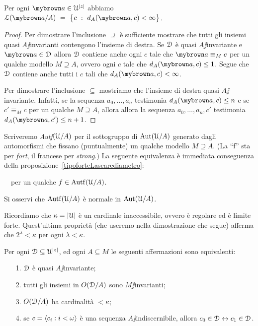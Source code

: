 \begin{proposition}\label{tipoforteLascarediametro} Per ogni ${\mr a}\in\U^{|z|}$ abbiamo $\Ll({\mr a}/A)\ =\ \big\{c\ :\ d_A({\mr a},c)<\infty\big\}$.
\end{proposition}

\begin{proof}
Per dimostrare l'inclusione $\supseteq$ \`e sufficiente mostrare che tutti gli insiemi quasi $A\jj$invarianti contengono l'insieme di destra. Se $\EuScript D$ \`e quasi $A\jj$invariante e ${\mr a}\in\D$ allora $\EuScript D$  contiene anche ogni $c$ tale che ${\mr a}\equiv_M c$ per un qualche modello $M\supseteq A$, ovvero ogni $c$ tale che $d_A({\mr a},c)\le 1$. Segue che $\EuScript D$ contiene anche tutti i $c$ tali che $d_A({\mr a},c)<\infty$. 

Per dimostrare l'inclusione $\subseteq$ mostriamo che l'insieme di destra quasi $A\jj$invariante. Infatti, se la sequenza $a_0,\dots,a_n$ testimonia  $d_A({\mr a},c)\le n$ e se $c'\equiv_Mc$ per un qualche $M\supseteq A$, allora allora la sequenza $a_0,\dots,a_n,c'$ testimonia $d_A({\mr a},c')\le n+1$.
\end{proof}

Scriveremo \emph{Autf$(\EuScript U/A)$\/} per il sottogruppo di $\textrm{Aut}(\EuScript U/A)$ generato dagli automorfismi che fissano (puntualmente) un qualche modello $M\supseteq A$. (La ``f'' sta per \textit{fort\/}, il francese per \textit{strong}.) La seguente equivalenza \`e immediata conseguenza della proposizione~\ref{tipoforteLascarediametro}: 

\ \ per un qualche $f\in{\rm Autf}(\EuScript U/A)$.

Si osservi che  ${\rm Autf}(\EuScript U/A)$ \`e normale in  $\textrm{Aut}(\EuScript U/A)$.

Ricordiamo che $\kappa=|\EuScript U|$ \`e un cardinale inaccessibile, ovvero \`e regolare ed \`e limite forte. Quest'ultima propriet\`a (che useremo nella dimostrazione che segue) afferma che $2^\lambda<\kappa$ per ogni $\lambda<\kappa$.

\begin{proposition}
Per ogni $\EuScript D\subseteq\EuScript U^{|z|}$, ed ogni $A\subseteq M$ le seguenti affermazioni sono equivalenti:
\begin{itemize}
\item[1.] $\EuScript D$ \`e quasi $A\jj$invariante;
\item[2.] tutti gli insiemi in $O(\EuScript D/A)$ sono $M\jj$invarianti;
\item[3.] $O(\EuScript D/A)$ ha cardinalit\`a $<\kappa$;
\item[4.] se $c=\langle c_i:i<\omega\rangle$ \`e una sequenza $A\jj$indiscernibile, allora $c_0\in\EuScript D\leftrightarrow c_1\in\EuScript D$.
\end{itemize}
\end{proposition}

